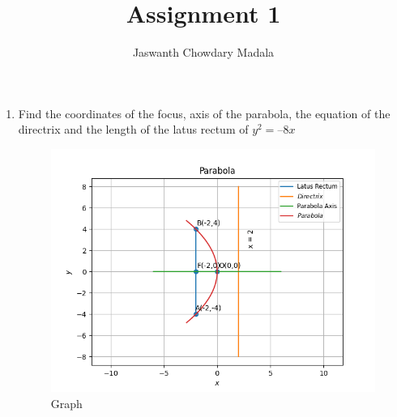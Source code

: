 \documentclass[journal,12pt,twocolumn]{IEEEtran}
\begin{document}
\vspace{3cm}


\title{Assignment 1}
\author{Jaswanth Chowdary Madala}





\maketitle

\newpage


\bigskip

\renewcommand{\thefigure}{\theenumi}
\renewcommand{\thetable}{\theenumi}


\begin{enumerate}
\item Find the coordinates of the focus, axis of the
parabola, the equation of the directrix and the length of the latus rectum of $y^2 = –8x$
\begin{figure}[ht]
\centering
\includegraphics[width = \columnwidth]{"./figs/fig.png"}
\caption{Graph}
\label{fig:1}
\end{figure}


\end{enumerate}
\end{document}

